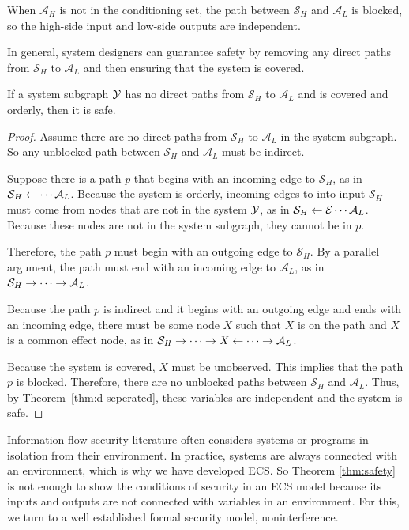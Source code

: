 \documentclass[../thesis.tex]{subfiles}
\begin{document}
When $\mathcal{A}_H$ is not in the conditioning set,
the path between $\mathcal{S}_H$ and $\mathcal{A}_L$
is blocked, so the high-side input and low-side
outputs are independent.

In general, system designers can guarantee safety
by removing any direct paths from $\mathcal{S}_H$ to
$\mathcal{A}_L$ and then ensuring that the system is
covered.

\begin{thm}
  \label{thm:safety}
  If a system subgraph $\mathcal{Y}$ has no direct paths from
  $\mathcal{S}_H$ to $\mathcal{A}_L$ and is covered
  and orderly, then it is safe.
\end{thm}
\begin{proof}
  Assume there are no direct paths from $\mathcal{S}_H$ to
  $\mathcal{A}_L$ in the system subgraph.
  So any unblocked path between $\mathcal{S}_H$ and
  $\mathcal{A}_L$ must be indirect.
  
  Suppose there is a path $p$ that begins
  with an incoming edge to $\mathcal{S}_H$,
  as in $\mathcal{S}_H \leftarrow \cdots \mathcal{A}_L$.
  Because the system is orderly, incoming edges
  to into input $\mathcal{S}_H$ must come
  from nodes that are not in the system $\mathcal{Y}$,
  as in $\mathcal{S}_H \leftarrow \mathcal{E} \cdots \mathcal{A}_L$.
  Because these
  nodes are not in the system subgraph, they cannot be
  in $p$.
  
  Therefore, the path $p$ must begin with an outgoing edge to
  $\mathcal{S}_H$. By a parallel argument, the path
  must end with an incoming edge to $\mathcal{A}_L$,
  as in $\mathcal{S}_H \rightarrow \cdots \rightarrow \mathcal{A}_L$.

  Because the path $p$ is indirect and it begins with an outgoing
  edge and ends with an incoming edge, there must be some
  node $X$ such that $X$ is on the path and $X$ is a common
  effect node, 
  as in 
  $\mathcal{S}_H \rightarrow \cdots \rightarrow X \leftarrow \cdots \rightarrow \mathcal{A}_L$.
  
  Because the system is covered, $X$ must be unobserved.
  This implies that the path $p$ is blocked.
  Therefore, there are no unblocked paths between
  $\mathcal{S}_H$ and $\mathcal{A}_L$.
  Thus, by Theorem~\ref{thm:d-seperated}, these
  variables are independent and the system is safe.
\end{proof}

Information flow security literature often considers
systems or programs in isolation from their environment.
In practice, systems are always connected with an environment,
which is why we have developed ECS.
So Theorem \ref{thm:safety} is not enough to show the conditions of
security in an ECS model because its inputs and outputs
are not connected with variables in an environment.
For this, we turn to a well established formal security model,
noninterference.
\end{document}
